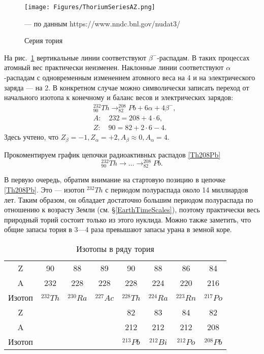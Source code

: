 \documentclass[a5paper,openany]{book}
\begin{document}
\begin{figure}[ht] 
	\centering\small
	\texttt{[image: Figures/ThoriumSeriesAZ.png]}
	\caption{Серия тория} 	--- по данным https://www.nndc.bnl.gov/nudat3/
	\label{f:ThLead}
\end{figure}
На  рис.~\ref{f:ThLead} вертикальные линии соответствуют $\beta^{-}$-распадам. В таких процессах атомный вес практически неизменен. Наклонные линии соответствуют $\alpha$-распадам с одновременным изменением атомного веса на 4 и на электрического заряда --- на 2. В конкретном случае можно символически записать переход от начального изотопа к конечному и баланс весов и электрических зарядов:
\begin{align} 
& _{90}^{232}Th \longrightarrow  _{82}^{208}Pb + 6 \alpha+  4\beta^{-}, \label{ThSeriesShort} \\
& A: \quad 232 = 208 + 4 \cdot 6, \label{ThSeriesShortA} \\
& Z: \quad 90 = 82 + 2 \cdot 6 - 4. \label{ThSeriesShortZ}
\end{align}
Здесь учтено, что $Z_{\beta}=-1, Z_{\alpha}=+2, A_{\beta} \approx 0, A_{\alpha} =4$.

Прокоментируем график цепочки радиоактивных распадов  \eqref{Th208Pb} 
\begin{equation*} 
	_{90}^{232}Th \longrightarrow \ldots \longrightarrow _{82}^{208}Pb.
\end{equation*}


В первую очередь, обратим внимание на стартовую позицию в цепочке \eqref{Th208Pb}. Это --- изотоп 
 $^{232}Th$ с периодом полураспада около 14 миллиардов лет. Таким образом, он обладает достаточно большим периодом полураспада по отношению к возрасту Земли (см. \S\ref{EarthTimeScales}), поэтому практически весь природный торий состоит только из этого нуклида. Можно также заметить, что общие запасы тория в 3—4 раза превышают запасы урана в земной коре.

\begin{table}
{\footnotesize 
\begin{tabular}{c|ccccccc}
	\hline
Z	& 90  & 88 &  89 &  90 &  88 &  86 &  84  \\
A	&  232  & 228 &  228  & 228  & 224 &  220 &  216  \\
Изотоп	&  $^{232}Th$  & $^{230}Ra$ & $^{227}Ac$ & $^{228}Th$ & $^{224}Ra$ & $^{223}Rn$ & $^{217}Po$   \\
\hline
Z	 &  ~ &  ~ &  ~ &  82 &  83 &  84  & 82 \\
A	  &  ~ &  ~ &  ~ &  212 &  212 &  212  & 208 \\
Изотоп	 &  ~ &  ~ &  ~ & $^{213}Pb$ & $^{212}Bi$ & $^{212}Po$ & $^{208}Pb$ \\
\hline
\end{tabular}
}
\caption{Изотопы в ряду тория}
\label{t:ThSeries}
\end{table}
\end{document}
